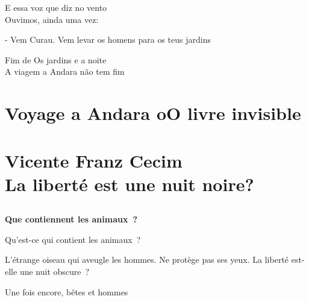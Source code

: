 \pagebreak

E essa voz que diz no vento\\

Ouvimos, ainda uma vez:

- Vem Curau. Vem levar os homens para os teus jardins


\vfill
Fim de Os jardins e a noite\\

A viagem a Andara não tem fim



\part*{Voyage a Andara oO livre invisible\\
\bigskip
\bigskip
\bigskip
\bigskip
{}\\
\Large{Vicente Franz Cecim}\\
\bigskip
\bigskip
\normalsize{La liberté est une nuit noire?}}


\chapter*{}


\textbf{Que contiennent les animaux~?}

Qu'est-ce qui contient les animaux~?

L'étrange oiseau qui aveugle les hommes. Ne protège pas ses yeux. La
liberté est-elle une nuit obscure~?

Une fois encore, bêtes et hommes

